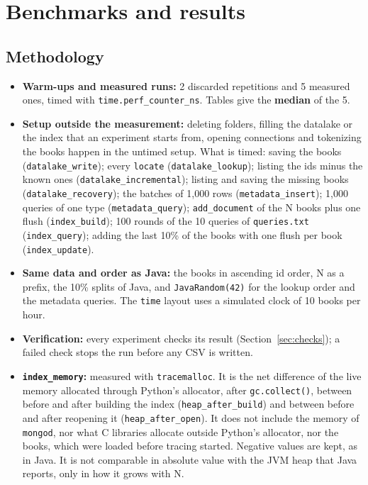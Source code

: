 \documentclass[11pt,a4paper]{article}
\newcommand{\code}[1]{\texttt{#1}}
\begin{document}
\section{Benchmarks and results}\label{sec:bench}

\subsection{Methodology}
\begin{itemize}
  \item \textbf{Warm-ups and measured runs:} 2 discarded repetitions and 5 measured ones, timed with
        \code{time.perf\_counter\_ns}. Tables give the \textbf{median} of the 5.
  \item \textbf{Setup outside the measurement:} deleting folders, filling the datalake or the
        index that an experiment starts from, opening connections and tokenizing the books happen
        in the untimed setup. What is timed: saving the books (\code{datalake\_write}); every
        \code{locate} (\code{datalake\_lookup}); listing the ids minus the known ones
        (\code{datalake\_incremental}); listing and saving the missing books
        (\code{datalake\_recovery}); the batches of 1,000 rows (\code{metadata\_insert}); 1,000
        queries of one type (\code{metadata\_query}); \code{add\_document} of the N books plus one
        flush (\code{index\_build}); 100 rounds of the 10 queries of \code{queries.txt}
        (\code{index\_query}); adding the last 10\% of the books with one flush per book
        (\code{index\_update}).
  \item \textbf{Same data and order as Java:} the books in ascending id order, N as a prefix,
        the 10\% splits of Java, and \code{JavaRandom(42)} for the lookup order and the metadata
        queries. The \code{time} layout uses a simulated clock of 10 books per hour.
  \item \textbf{Verification:} every experiment checks its result (Section~\ref{sec:checks}); a
        failed check stops the run before any CSV is written.
  \item \textbf{\code{index\_memory}:} measured with \code{tracemalloc}. It is the net difference of
        the live memory allocated through Python's allocator, after \code{gc.collect()}, between
        before and after building the index (\code{heap\_after\_build}) and between before and
        after reopening it (\code{heap\_after\_open}). It does not include the memory of
        \code{mongod}, nor what C libraries allocate outside Python's allocator, nor the books, which
        were loaded before tracing started. Negative values are kept, as in Java. It is not
        comparable in absolute value with the JVM heap that Java reports, only in how it grows
        with N.
\end{itemize}
\end{document}
